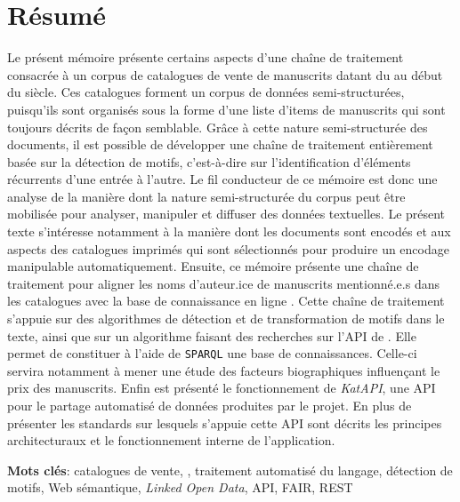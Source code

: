 
\frontmatter
\chapter*{Résumé}
Le présent mémoire présente certains aspects d'une chaîne de traitement consacrée à un corpus de catalogues de vente de manuscrits datant du  au début du  siècle. Ces catalogues forment un corpus de données semi-structurées, puisqu'ils sont organisés sous la forme d'une liste d'items de manuscrits qui sont toujours décrits de façon semblable. Grâce à cette nature semi-structurée des documents, il est possible de développer une chaîne de traitement entièrement basée sur la détection de motifs, c'est-à-dire sur l'identification d'éléments récurrents d'une entrée à l'autre. Le fil conducteur de ce mémoire est donc une analyse de la manière dont la nature semi-structurée du corpus peut être mobilisée pour analyser, manipuler et diffuser des données textuelles. Le présent texte s'intéresse notamment à la manière dont les documents sont encodés et aux aspects des catalogues imprimés qui sont sélectionnés pour produire un encodage manipulable automatiquement. Ensuite, ce mémoire présente une chaîne de traitement pour aligner les noms d'auteur.ice de manuscrits mentionné.e.s dans les catalogues avec la base de connaissance en ligne \wkd{}. Cette chaîne de traitement s'appuie sur des algorithmes de détection et de transformation de motifs dans le texte, ainsi que sur un algorithme faisant des recherches sur l'API de \wkd{}. Elle permet de constituer à l'aide de \texttt{SPARQL} une base de connaissances. Celle-ci servira notamment à mener une étude des facteurs biographiques influençant le prix des manuscrits. Enfin est présenté le fonctionnement de \textit{KatAPI}, une API pour le partage automatisé de données produites par le projet. En plus de présenter les standards sur lesquels s'appuie cette API sont décrits les principes architecturaux et le fonctionnement interne de l'application.

\vfill

\noindent\textbf{Mots clés}: catalogues de vente, \mssktb, traitement automatisé du langage, détection de motifs, Web sémantique, \textit{Linked Open Data}, API, FAIR, REST

